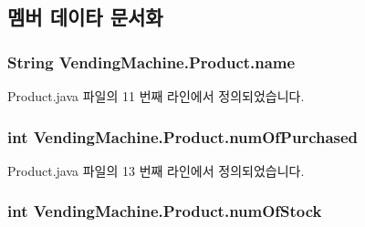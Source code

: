 \subsection{멤버 데이타 문서화}
\subsubsection[{\texorpdfstring{name}{name}}]{\setlength{\rightskip}{0pt plus 5cm}String Vending\+Machine.\+Product.\+name\hspace{0.3cm}{\ttfamily [private]}}\hypertarget{class_vending_machine_1_1_product_a6d22fc106e78c69153cbf8d4ca1d53e3}{}\label{class_vending_machine_1_1_product_a6d22fc106e78c69153cbf8d4ca1d53e3}


Product.\+java 파일의 11 번째 라인에서 정의되었습니다.

\subsubsection[{\texorpdfstring{num\+Of\+Purchased}{numOfPurchased}}]{\setlength{\rightskip}{0pt plus 5cm}int Vending\+Machine.\+Product.\+num\+Of\+Purchased\hspace{0.3cm}{\ttfamily [private]}}\hypertarget{class_vending_machine_1_1_product_a7aed5b6b474729af5d417af9f7d8115e}{}\label{class_vending_machine_1_1_product_a7aed5b6b474729af5d417af9f7d8115e}


Product.\+java 파일의 13 번째 라인에서 정의되었습니다.

\subsubsection[{\texorpdfstring{num\+Of\+Stock}{numOfStock}}]{\setlength{\rightskip}{0pt plus 5cm}int Vending\+Machine.\+Product.\+num\+Of\+Stock\hspace{0.3cm}{\ttfamily [private]}}\hypertarget{class_vending_machine_1_1_product_ab5412dead0747c2da7e8e686c2e7bd15}{}\label{class_vending_machine_1_1_product_ab5412dead0747c2da7e8e686c2e7bd15}


